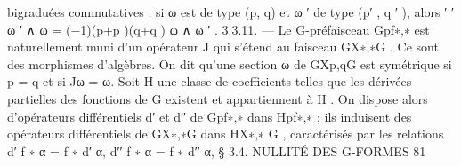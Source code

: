 \documentclass[
  10pt,
]{article}
\newenvironment{Shaded}{}{}
\newcommand{\NormalTok}[1]{#1}
\begin{document}
\begin{Shaded}
\begin{Highlighting}[]
\NormalTok{bigraduées commutatives : si ω est de type (p, q) et ω ′ de type (p′ , q ′ ), alors}
\NormalTok{                                                    ′     ′}
\NormalTok{                                ω ′ ∧ ω = (−1)(p+p )(q+q ) ω ∧ ω ′ .}
\NormalTok{3.3.11. — Le G{-}préfaisceau Gpf∗,∗ est naturellement muni d’un opérateur J qui s’étend}
\NormalTok{au faisceau GX∗,∗G . Ce sont des morphismes d’algèbres. On dit qu’une section ω de GXp,qG}
\NormalTok{est symétrique si p = q et si Jω = ω.}
\NormalTok{    Soit H une classe de coefficients telles que les dérivées partielles des fonctions de G}
\NormalTok{existent et appartiennent à H . On dispose alors d’opérateurs différentiels d′ et d′′ de}
\NormalTok{Gpf∗,∗ dans Hpf∗,∗ ; ils induisent des opérateurs différentiels de GX∗,∗G dans HX∗,∗}
\NormalTok{                                                                                  G}
\NormalTok{                                                                                     , caractérisés}
\NormalTok{par les relations}
\NormalTok{                               d′ f ∗ α = f ∗ d′ α, d′′ f ∗ α = f ∗ d′′ α,}
\NormalTok{                                 § 3.4. NULLITÉ DES G{-}FORMES                             81}


\end{Highlighting}
\end{Shaded}
\end{document}
